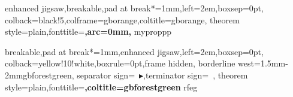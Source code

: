 \usepackage{listings}
\usepackage{tikz,pgf}
\usetikzlibrary{calc}


\newenvironment{example}[3][代码]%
{\list{}{\begingroup\codecaption{#2}\label{#3}\endgroup
\setlength{\topsep}{0pt}
\setlength{\partopsep}{0pt}
\setlength{\itemsep}{0pt}
\setlength{\parsep}{0pt}
\setlength{\leftmargin}{0pt}%
\setlength{\itemindent}{0pt}%
}\item[\footnotesize\color{gbblue}\bfseries#1]\relax}
{\endlist}


%
{%
}
{}

\usepackage[listings,theorems,most]{tcolorbox}
{enhanced jigsaw,breakable,pad at break*=1mm,left=2em,boxsep=0pt,
 colback=black!5,colframe=gborange,coltitle=gborange,
 theorem style=plain,fonttitle=\bfseries,arc=0mm,
}{myprop}{pp}

{breakable,pad at break*=1mm,enhanced jigsaw,left=2em,boxsep=0pt,
 colback=yellow!10!white,boxrule=0pt,frame hidden,
 borderline west={1.5mm}{-2mm}{gbforestgreen},
separator sign={\ $\blacktriangleright$},terminator sign={\ },
theorem style=plain,fonttitle=\bfseries,coltitle=gbforestgreen
}{rfeg}
\newcommand{\bibliofmt}[1]{\medskip\textcolor{gbforestgreen}{\heiti#1}}

